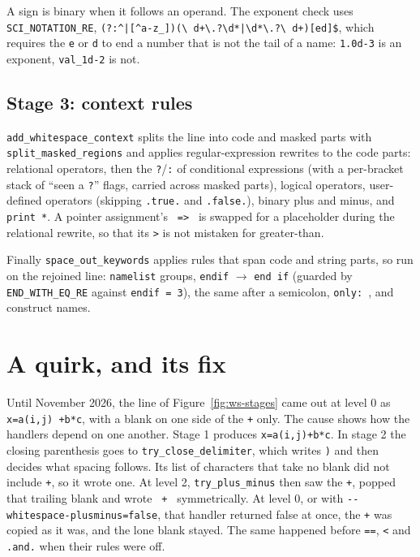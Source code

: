 \documentclass[11pt,a4paper,openany]{book}
\newcommand{\code}[1]{\texttt{\small #1}}
\begin{document}
A sign is binary when it follows an operand. The exponent check uses
\code{SCI\_NOTATION\_RE}, \code{(?:\^{}|[\^{}a-z\_])(\textbackslash
d+\textbackslash.?\textbackslash d*|\textbackslash d*\textbackslash.?\textbackslash
d+)[ed]\$}, which requires the \code{e} or \code{d} to end a number that is not
the tail of a name: \code{1.0d-3} is an exponent, \code{val\_1d-2} is not.

\subsection{Stage 3: context rules}

\code{add\_whitespace\_context} splits the line into code and masked parts with
\code{split\_masked\_regions} and applies regular-expression rewrites to the
code parts: relational operators, then the \code{?}/\code{:} of conditional
expressions (with a per-bracket stack of ``seen a \code{?}'' flags, carried
across masked parts), logical operators, user-defined operators (skipping
\code{.true.} and \code{.false.}), binary plus and minus, and \code{print *}.
A pointer assignment's \code{ => } is swapped for a placeholder during the
relational rewrite, so that its \code{>} is not mistaken for greater-than.

Finally \code{space\_out\_keywords} applies rules that span code and string parts,
so run on the rejoined line: \code{namelist} groups, \code{endif} $\to$
\code{end if} (guarded by \code{END\_WITH\_EQ\_RE} against \code{endif = 3}),
the same after a semicolon, \code{only: }, and construct names.

\section{A quirk, and its fix}

Until November 2026, the line of Figure~\ref{fig:ws-stages} came out at level 0
as \code{x=a(i,j) +b*c}, with a blank on one side of the \code{+} only. The
cause shows how the handlers depend on one another. Stage 1 produces
\code{x=a(i,j)+b*c}. In stage 2 the closing parenthesis goes to
\code{try\_close\_delimiter}, which writes \code{)} and then decides what
spacing follows. Its list of characters that take no blank did not include
\code{+}, so it wrote one. At level 2, \code{try\_plus\_minus} then saw the
\code{+}, popped that trailing blank and wrote \code{ + } symmetrically. At level
0, or with \code{-{}-whitespace-plusminus=false}, that handler returned false
at once, the \code{+} was copied as it was, and the lone blank stayed. The same
happened before \code{==}, \code{<} and \code{.and.} when their rules were off.
\end{document}
